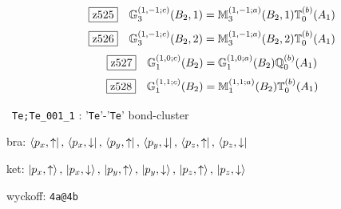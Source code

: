 \documentclass[fleqn,10pt,landscape]{jsarticle}
\begin{document}
\begin{dmath*}
\hspace*{3mm}\fbox{z525}\quad \mathbb{G}_{3}^{(1,-1;c)}(B_{2},1)=\mathbb{M}_{3}^{(1,-1;a)}(B_{2},1) \mathbb{T}_{0}^{(b)}(A_{1})
\end{dmath*}
\begin{dmath*}
\hspace*{3mm}\fbox{z526}\quad \mathbb{G}_{3}^{(1,-1;c)}(B_{2},2)=\mathbb{M}_{3}^{(1,-1;a)}(B_{2},2) \mathbb{T}_{0}^{(b)}(A_{1})
\end{dmath*}
\begin{dmath*}
\hspace*{3mm}\fbox{z527}\quad \mathbb{G}_{1}^{(1,0;c)}(B_{2})=\mathbb{G}_{1}^{(1,0;a)}(B_{2}) \mathbb{Q}_{0}^{(b)}(A_{1})
\end{dmath*}
\begin{dmath*}
\hspace*{3mm}\fbox{z528}\quad \mathbb{G}_{1}^{(1,1;c)}(B_{2})=\mathbb{M}_{1}^{(1,1;a)}(B_{2}) \mathbb{T}_{0}^{(b)}(A_{1})
\end{dmath*}
\vspace{5mm}

\noindent\textbullet\, \texttt{Te;Te_001_1} : '\texttt{Te}'-'\texttt{Te}' bond-cluster

\noindent\quad * bra: $\bra{p_{x},\uparrow},\, \bra{p_{x},\downarrow},\, \bra{p_{y},\uparrow},\, \bra{p_{y},\downarrow},\, \bra{p_{z},\uparrow},\, \bra{p_{z},\downarrow}$

\noindent\quad * ket: $\ket{p_{x},\uparrow},\, \ket{p_{x},\downarrow},\, \ket{p_{y},\uparrow},\, \ket{p_{y},\downarrow},\, \ket{p_{z},\uparrow},\, \ket{p_{z},\downarrow}$

\noindent\quad * wyckoff: \texttt{4a@4b}
\end{document}
